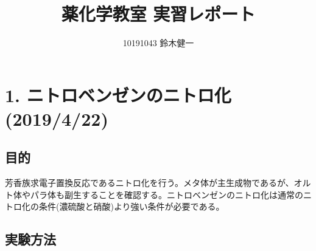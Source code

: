 \documentclass[a4paper,papersize,dvipdfmx]{jsarticle}
\begin{document}
\title{薬化学教室 実習レポート}
\author{10191043 鈴木健一}
\date{}
\maketitle

\small


\section*{1. ニトロベンゼンのニトロ化 (2019/4/22)}

\subsection*{目的}
芳香族求電子置換反応であるニトロ化を行う。メタ体が主生成物であるが、オルト体やパラ体も副生することを確認する。ニトロベンゼンのニトロ化は通常のニトロ化の条件(濃硫酸と硝酸)より強い条件が必要である。

\subsection*{実験方法}
\end{document}
